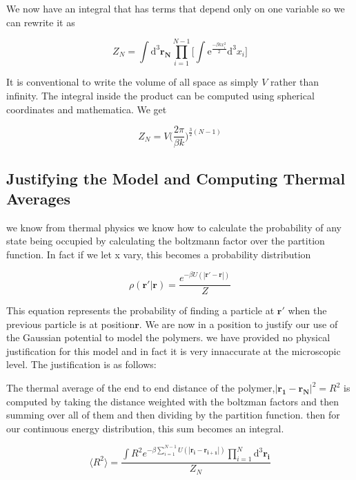 \documentclass{article}
\begin{document}
We now have an integral that has terms that depend only on one variable so we can rewrite it as 

\begin{equation}
Z_N=\int \mathrm{d}^3\mathbf{r_N} \prod\limits_{i=1}^{N-1}\Big[ \int \mathrm{e}^{\frac{-\beta kx_i^2}{2}} \mathrm{d}^3 x_i \Big]
\end{equation}

It is conventional to write the volume of all space as simply \(V\) rather than infinity. The integral inside the product can be computed using spherical coordinates and mathematica. We get 

\begin{equation}
Z_N=V\Big(\frac{2\pi}{\beta k}\Big)^{\frac{3}{2}(N-1)}
\end{equation}

\subsection{Justifying the Model and Computing Thermal Averages}

we know from thermal physics we know how to calculate the probability of any state being occupied by calculating the boltzmann factor over the partition function. In fact if we let x vary, this becomes a probability distribution

\begin{equation}
\rho(\mathbf{r'}|\mathbf{r})=\frac{e^{-\beta U(|\mathbf{r'-r}|)}}{Z}
\end{equation}

This equation represents the probability of finding a particle at \(\mathbf{r'}\) when the previous particle is at position\( \mathbf{r}\).
We are now in a position to justify our use of the Gaussian potential to model the polymers. we have provided no physical justification for this model and in fact it is very innaccurate at the microscopic level. The justification is as follows:

The thermal average of the end to end distance of the polymer,\( |\mathbf{r_1-r_N}|^2 = R^2\) is computed by taking the distance weighted with the boltzman factors and then summing over all of them and then dividing by the partition function. then for our continuous energy distribution, this sum becomes an integral. 

\begin{equation}
\langle R^2 \rangle = \frac{\int R^2 e^{-\beta\sum\limits_{i=1}^{N-1}U(|\mathbf{r_i-r_{i+1}}|)}\prod\limits_{i=1}^N \mathrm{d}^3\mathbf{r_i}}{Z_N}
\end{equation}
 
\end{document}
